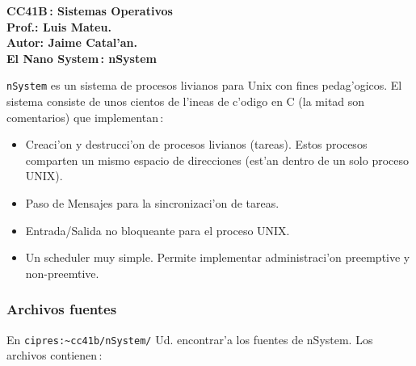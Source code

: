 
\parindent 0in
      

\begin{center}
{\large\bf CC41B\,: Sistemas Operativos}\\
{\bf Prof.: Luis Mateu.}\\
{\bf Autor: Jaime Catal'an.}\\
\bigskip
{\large \bf El Nano System\,: nSystem}
\end{center}

\bigskip
{\tt nSystem} es un sistema de procesos livianos para Unix con fines
pedag'ogicos.  El sistema consiste de unos cientos de l'ineas de
c'odigo en C (la mitad son comentarios) que implementan\,:

\begin{itemize}

\item Creaci'on y destrucci'on de procesos livianos (tareas).  Estos procesos
comparten un mismo espacio de direcciones (est'an dentro de un solo
proceso UNIX).

\item Paso de Mensajes para la sincronizaci'on de tareas.

\item Entrada/Salida no bloqueante para el proceso UNIX.

\item Un scheduler muy simple. Permite implementar administraci'on preemptive
y non-preemtive.


\end{itemize}


\subsubsection*{Archivos fuentes}

En \verb+cipres:~cc41b/nSystem/+ Ud. encontrar'a los fuentes de nSystem.
Los archivos contienen\,:

